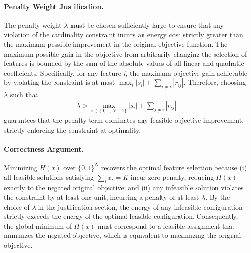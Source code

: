 \documentclass[12pt]{article}
\begin{document}
\paragraph{Penalty Weight Justification.}
The penalty weight $\lambda$ must be chosen sufficiently large to ensure that any violation of the cardinality constraint incurs an energy cost strictly greater than the maximum possible improvement in the original objective function. The maximum possible gain in the objective from arbitrarily changing the selection of features is bounded by the sum of the absolute values of all linear and quadratic coefficients. Specifically, for any feature $i$, the maximum objective gain achievable by violating the constraint is at most $\max_i |s_i| + \sum_{j \neq i} |r_{ij}|$. Therefore, choosing $\lambda$ such that
\begin{align}
  \lambda > \max_{i \in \{0,\dots,N-1\}} |s_i| + \sum_{j \neq i} |r_{ij}|
\end{align}
guarantees that the penalty term dominates any feasible objective improvement, strictly enforcing the constraint at optimality.

\paragraph{Correctness Argument.}
Minimizing $H(x)$ over $\{0,1\}^N$ recovers the optimal feature selection because (i) all feasible solutions satisfying $\sum_i x_i = K$ incur zero penalty, reducing $H(x)$ exactly to the negated original objective; and (ii) any infeasible solution violates the constraint by at least one unit, incurring a penalty of at least $\lambda$. By the choice of $\lambda$ in the justification section, the energy of any infeasible configuration strictly exceeds the energy of the optimal feasible configuration. Consequently, the global minimum of $H(x)$ must correspond to a feasible assignment that minimizes the negated objective, which is equivalent to maximizing the original objective.
\end{document}
